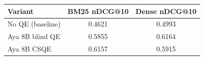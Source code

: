 \begin{tabular}{lcc}
\toprule
Variant & BM25 nDCG@10 & Dense nDCG@10 \\
\midrule
No QE (baseline) & 0.4621 & 0.4993 \\
Aya 8B blind QE & 0.5855 & 0.6164 \\
Aya 8B CSQE & 0.6157 & 0.5915 \\
\bottomrule
\end{tabular}
